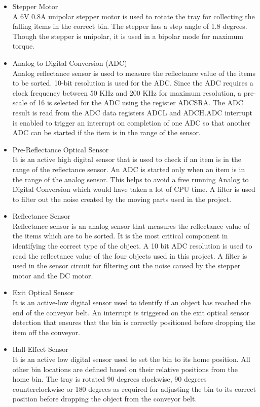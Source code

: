 \begin{itemize}
\item Stepper Motor\\
A 6V 0.8A unipolar stepper motor is used to rotate the tray for collecting the falling items in the correct bin. The stepper has a step angle of 1.8 degrees. Though the stepper is unipolar, it is used in a bipolar mode for maximum torque.

\item Analog to Digital Conversion (ADC)\\
Analog reflectance sensor is used to measure the reflectance value of the items to be sorted. 10-bit resolution is used for the ADC. Since the ADC requires a clock frequency between 50 KHz and 200 KHz for maximum resolution, a pre-scale of 16 is selected for the ADC using the register ADCSRA. The ADC result is read from the ADC data registers ADCL and ADCH.ADC interrupt is enabled to trigger an interrupt on completion of one ADC so that another ADC can be started if the item is in the range of the sensor.

\item Pre-Reflectance Optical Sensor\\
It is an active high digital sensor that is used to check if an item is in the range of the reflectance sensor. An ADC is started only when an item is in the range of the analog sensor. This helps to avoid a free running Analog to Digital Conversion which would have taken a lot of CPU time. A filter is used to filter out the noise created by the moving parts used in the project.

\item Reflectance Sensor\\
Reflectance sensor is an analog sensor that measures the reflectance value of the items which are to be sorted. It is the most critical component in identifying the correct type of the object. A 10 bit ADC resolution is used to read the reflectance value of the four objects used in this project. A filter is used in the sensor circuit for filtering out the noise caused by the stepper motor and the DC motor.

\item Exit Optical Sensor\\
It is an active-low digital sensor used to identify if an object has reached the end of the conveyor belt. An interrupt is triggered on the exit optical sensor detection that ensures that the bin is correctly positioned before dropping the item off the conveyor.

\item Hall-Effect Sensor\\
It is an active low digital sensor used to set the bin to its home position. All other bin locations are defined based on their relative positions from the home bin. The tray is rotated 90 degrees clockwise, 90 degrees counterclockwise or 180 degrees as required for adjusting the bin to its correct position before dropping the object from the conveyor belt.


\end{itemize}
